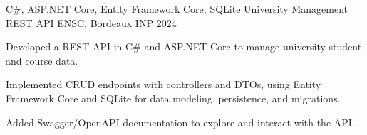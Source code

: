 
\begin{cventries}
  \cventry
    {C\#, ASP.NET Core, Entity Framework Core, SQLite}
    {University Management REST API}
    {ENSC, Bordeaux INP}
    {2024}
    {
      \begin{cvitems}
        \item {Developed a REST API in C\# and ASP.NET Core to manage university student and course data.}
        \item {Implemented CRUD endpoints with controllers and DTOs, using Entity Framework Core and SQLite for data modeling, persistence, and migrations.}
        \item {Added Swagger/OpenAPI documentation to explore and interact with the API.}
      \end{cvitems}
    }
\end{cventries}
